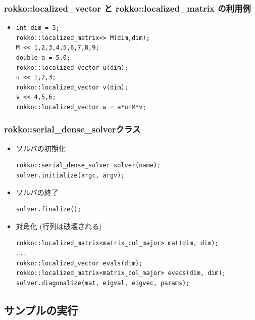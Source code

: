 \begin{frame}[c,fragile]
  \frametitle{rokko::localized\_vector と rokko::localized\_matrix の利用例}
  \begin{itemize}
  \item {}
\begin{lstlisting}
int dim = 3;
rokko::localized_matrix<> M(dim,dim);
M << 1,2,3,4,5,6,7,8,9;
double a = 5.0;
rokko::localized_vector u(dim);
u << 1,2,3;
rokko::localized_vector v(dim);
v << 4,5,6;
rokko::localized_vector w = a*u+M*v;
\end{lstlisting}
  \end{itemize}
\end{frame}

\begin{frame}[c,fragile]
  \frametitle{rokko::serial_dense_solverクラス}
  \begin{itemize}
  \item ソルバの初期化
\begin{lstlisting}
rokko::serial_dense_solver solver(name);
solver.initialize(argc, argv);
\end{lstlisting}
  \item ソルバの終了
\begin{lstlisting}
solver.finalize();
\end{lstlisting}
  \item 対角化 (行列は破壊される)
\begin{lstlisting}
rokko::localized_matrix<matrix_col_major> mat(dim, dim);
...
rokko::localized_vector evals(dim);
rokko::localized_matrix<matrix_col_major> evecs(dim, dim);
solver.diagonalize(mat, eigval, eigvec, params);
\end{lstlisting}
  \end{itemize}
\end{frame}

\subsection*{サンプルの実行}

